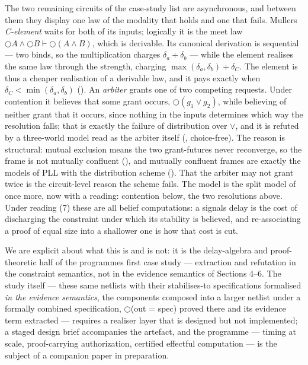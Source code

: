 The two remaining circuits of the case-study list are asynchronous, and
between them they display one law of the modality that holds and one
that fails. Muller\textquotesingle s \emph{C-element} waits for both of
its inputs; logically it is the meet law \ensuremath{\bigcirc A \wedge
\bigcirc B \vdash \bigcirc(A \wedge B)}, which is derivable. Its
canonical derivation is sequential --- two binds, so the multiplication
charges \ensuremath{\delta_{a} + \delta_{b}} --- while the element
realises the same law through the strength, charging
\ensuremath{\max(\delta_{a}, \delta_{b}) + \delta_{C}}. The element is
thus a cheaper realisation of a derivable law, and it pays exactly when
\ensuremath{\delta_{C} < \min(\delta_{a}, \delta_{b})}
(). An \emph{arbiter} grants one of two
competing requests. Under contention it believes that some grant occurs,
\ensuremath{\bigcirc(g_{1} \vee g_{2})}, while believing of neither grant
that it occurs, since nothing in the inputs determines which way the
resolution falls; that is exactly the failure of distribution over
\ensuremath{\vee}, and it is refuted by a three-world model read as the
arbiter itself (, choice-free). The
reason is structural: mutual exclusion means the two grant-futures never
reconverge, so the frame is not mutually confluent
(), and mutually confluent frames are
exactly the models of PLL with the distribution scheme
(). That the arbiter may not grant
twice is the circuit-level reason the scheme fails. The model is the
split model of \cite[Fig.~3]{FairtloughMendler1997} once more, now with
a reading: contention below, the two resolutions above. Under reading (7) these
are all belief computations: a signal\textquotesingle s delay is the cost
of discharging the constraint under which its stability is believed,
and re-associating a proof of equal size into a shallower one is how
that cost is cut.

We are explicit about what this is and is not: it is the delay-algebra
and proof-theoretic half of the programme\textquotesingle s first case
study --- extraction and refutation in the constraint semantics, not in
the evidence semantics of Sections 4--6. The study itself --- these same
netlists with their stabilises-to specifications formalised
\emph{in the evidence semantics}, the components composed into a larger
netlist under a formally combined specification,
\ensuremath{\bigcirc}(out = spec) proved there and its evidence term
extracted --- requires a realiser layer that is designed but not
implemented; a staged design brief accompanies the artefact, and the
programme --- timing at scale, proof-carrying authorization, certified
effectful computation --- is the subject of a companion paper in
preparation.

